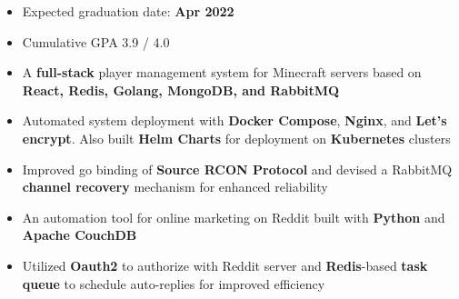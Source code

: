 
\begin{itemize}
\item Expected graduation date: \textbf{Apr 2022}
\item Cumulative GPA 3.9 \// 4.0 
\end{itemize}


\vspace{-2mm}
\begin{itemize}
 \item A \textbf{full-stack} player management system for Minecraft servers based on \textbf{React, Redis, Golang, MongoDB, and RabbitMQ}
 \item Automated system deployment with \textbf{Docker Compose}, \textbf{Nginx}, and \textbf{Let's encrypt}. Also built \textbf{Helm Charts} for deployment on \textbf{Kubernetes} clusters
 \item Improved go binding of \textbf{Source RCON Protocol} and devised a RabbitMQ \textbf{channel recovery} mechanism for enhanced reliability
 
\end{itemize}
\divider
\vspace{-2mm}
\vspace{-1mm}
\begin{itemize}
\item An automation tool for online marketing on Reddit built with \textbf{Python} and \textbf{Apache CouchDB}
\item Utilized \textbf{Oauth2} to authorize with Reddit server and \textbf{Redis}-based \textbf{task queue} to schedule auto-replies for improved efficiency
\end{itemize}
\vspace{-2mm}
\divider


